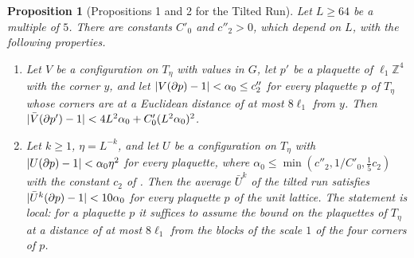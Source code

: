 \documentclass[11pt]{preprint}
\DeclarePairedDelimiter{\abs}{\lvert}{\rvert}
\numberwithin{equation}{section}
\newtheorem{proposition}[theorem]{Proposition}
\theoremstyle{definition}
\theoremstyle{remark}
\theoremstyle{plain}
\begin{document}
\begin{proposition}[Propositions 1 and 2 for the Tilted Run]\label{prop:averaging-plaquettes}
Let $L \geq 64$ be a multiple of $5$. There are constants $C'_0$ and $c''_2 > 0$, which depend on $L$, with the following properties.
\begin{enumerate}[label=(\roman*)]
\item Let $V$ be a configuration on $T_\eta$ with values in $G$, let $p'$ be a plaquette of $\ell_1\mathbb Z^4$ with the corner $y$, and let $\abs{V(\partial p) - 1} < \alpha_0 \leq c''_2$ for every plaquette $p$ of $T_\eta$ whose corners are at a Euclidean distance of at most $8\ell_1$ from $y$. Then $\abs{\bar V(\partial p') - 1} < 4L^2\alpha_0 + C'_0(L^2\alpha_0)^2$.
\item Let $k \geq 1$, $\eta = L^{-k}$, and let $U$ be a configuration on $T_\eta$ with $\abs{U(\partial p) - 1} < \alpha_0\eta^2$ for every plaquette, where $\alpha_0 \leq \min(c''_2, 1/C'_0, \frac15c_2)$ with the constant $c_2$ of \cite[Proposition~2]{BalabanAVG}. Then the average $\bar U^k$ of the tilted run satisfies $\abs{\bar U^k(\partial p) - 1} < 10\alpha_0$ for every plaquette $p$ of the unit lattice. The statement is local: for a plaquette $p$ it suffices to assume the bound on the plaquettes of $T_\eta$ at a distance of at most $8\ell_1$ from the blocks of the scale $1$ of the four corners of $p$.
\end{enumerate}
\end{proposition}
\end{document}
